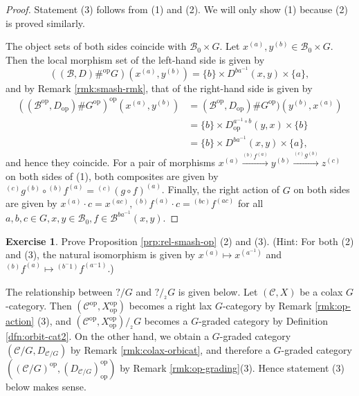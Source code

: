 \documentclass{surv-l}
\numberwithin{equation}{chapter}
\numberwithin{figure}{chapter}
\theoremstyle{plain}
\theoremstyle{definition}
\newtheorem{exc}[thm]{Exercise}
\theoremstyle{remark}
\newcommand{\sndorbit}{/\!_{_{2}}}
\def\smor(#1,#2,#3){{}^{(#1)}\!#2^{(#3)}}
\begin{document}
\begin{proof}
Statement (3) follows from (1) and (2).
We will only show (1) because (2) is proved similarly.

The object sets of both sides coincide with
$\mathcal{B}_0 \times G$.
Let $x^{(a)}, y^{(b)} \in \mathcal{B}_0 \times G$.
Then the local morphism set of the left-hand side is given by
\[
((\mathcal{B}, D) \#^{\mathrm{op}} G)(x^{(a)}, y^{(b)}) = \{b\} \times D^{ba^{-1}}(x,y) \times \{a\},
\]
and by Remark \ref{rmk:smash-rmk}, that of the right-hand side is given by
\[
\begin{aligned}
((\mathcal{B}^{\mathrm{op}}, D_\mathrm{op}) \# G^{\mathrm{op}})^{\mathrm{op}}(x^{(a)}, y^{(b)})
&= (\mathcal{B}^{\mathrm{op}}, D_\mathrm{op}) \# G^{\mathrm{op}})(y^{(b)}, x^{(a)})\\
&= \{b\} \times D_\mathrm{op}^{a^{-1} \circ b}(y, x) \times \{b\}\\
&= \{b\} \times D^{b a^{-1}}(x, y) \times \{a\},
\end{aligned}
\]
and hence they coincide.
For a pair of morphisms
$x^{(a)} \xrightarrow{\smor(b,f,a)} y^{(b)} \xrightarrow{\smor(c,g,b)} z^{(c)}$ on both sides of (1),
both composites are given by
$\smor(c,g,b)\circ \smor(b,f,a) = \smor(c, (g\circ f), a)$.
Finally, the right action of $G$ on both sides are given by
$x^{(a)}\cdot c = x^{(ac)}, \smor(b,f,a) \cdot c = \smor(bc, f, ac)$
for all $a, b, c \in G, x, y \in \mathcal{B}_0, f \in \mathcal{B}^{ba^{-1}}(x, y)$.
\end{proof}

\begin{exc}
Prove Proposition  \ref{prp:rel-smash-op} (2) and (3).
(Hint: For both (2) and (3),
the natural isomorphism is given by
$x^{(a)} \mapsto x^{(a^{-1})}$ and
$\smor(b, f, a) \mapsto \smor(b^{-1}, f, a^{-1})$.)
\end{exc}

The relationship between $?/G$ and $?\sndorbit G$ is given below.
Let $({\mathcal{C}}, X)$ be a colax $G$-category.
Then $({\mathcal{C}}^{\mathrm{op}}, X_\mathrm{op}^{\mathrm{op}})$ becomes
a right lax $G$-category  by Remark \ref{rmk:op-action} (3),
and $({\mathcal{C}}^{\mathrm{op}}, X_\mathrm{op}^{\mathrm{op}})\sndorbit G$ becomes a $G$-graded category by
Definition \ref{dfn:orbit-cat2}.
On the other hand,
we obtain a $G$-graded category $({\mathcal{C}}/G, D_{{\mathcal{C}}/G})$
by Remark \ref{rmk:colax-orbicat}, and therefore a $G$-graded category
$(({\mathcal{C}}/G)^{\mathrm{op}}, (D_{{\mathcal{C}}/G})^{\mathrm{op}}_\mathrm{op})$ by Remark \ref{rmk:op-grading}(3).
Hence statement (3) below makes sense.
\end{document}
